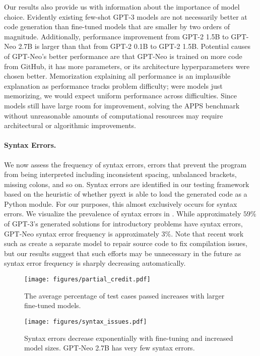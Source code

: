 \documentclass{article}
\begin{document}
Our results also provide us with information about the importance of model choice. Evidently existing few-shot GPT-3 models are not necessarily better at code generation than fine-tuned models that are smaller by two orders of magnitude. Additionally, performance improvement from GPT-2 1.5B to GPT-Neo 2.7B is larger than that from GPT-2 0.1B to GPT-2 1.5B. Potential causes of GPT-Neo's better performance are that GPT-Neo is trained on more code from GitHub, it has more parameters, or its architecture hyperparameters were chosen better. Memorization explaining all performance is an implausible explanation as performance tracks problem difficulty; were models just memorizing, we would expect uniform performance across difficulties. Since models still have large room for improvement, solving the APPS benchmark without unreasonable amounts of computational resources may require architectural or algorithmic improvements.

\paragraph{Syntax Errors.} We now assess the frequency of syntax errors, errors that prevent the program from being interpreted including inconsistent spacing, unbalanced brackets, missing colons, and so on. Syntax errors are identified in our testing framework based on the heuristic of whether pyext is able to load the generated code as a Python module. For our purposes, this almost exclusively occurs for syntax errors. We visualize the prevalence of syntax errors in . While approximately $59\%$ of GPT-3's generated solutions for introductory problems have syntax errors, GPT-Neo syntax error frequency is approximately $3\%$. Note that recent work such as \cite{Yasunaga2020GraphbasedSP} create a separate model to repair source code to fix compilation issues, but our results suggest that such efforts may be unnecessary in the future as syntax error frequency is sharply decreasing automatically.


\begin{figure}[t]
\begin{minipage}{.49\textwidth}
\centering
\texttt{[image: figures/partial\_credit.pdf]}
\caption{The average percentage of test cases passed increases with larger fine-tuned models.}\label{fig:partial}
\end{minipage}\hfill \begin{minipage}{.49\textwidth}
\centering
\texttt{[image: figures/syntax\_issues.pdf]}
\caption{Syntax errors decrease exponentially with fine-tuning and increased model sizes. GPT-Neo 2.7B has very few syntax errors.}\label{fig:syntax}
\end{minipage}
\end{figure}
\end{document}
